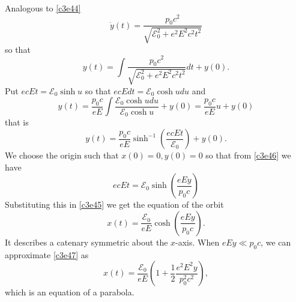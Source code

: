 \begin{enumerate}
Analogous to \eqref{c3e44}
\[
\dot{y}(t) = \frac{p_0c^2}{\sqrt{\mathcal{E}_0^2 + e^2E^2c^2t^2}}
\]
so that
\[
y(t) = \int \frac{p_0c^2}{\sqrt{\mathcal{E}_0^2 + e^2E^2c^2t^2}} dt + y(0).
\]
Put $ecEt = \mathcal{E}_0\sinh u$ so that $ecEdt = \mathcal{E}_0\cosh u du$
and
\[
y(t) = \frac{p_0c}{eE}\int \frac{\mathcal{E}_0\cosh u du}{\mathcal{E}_0\cosh u}
 + y(0) = \frac{p_0c}{eE} u + y(0) 
\]
that is
\begin{equation}\label{c3e46}
y(t) = \frac{p_0c}{eE} \sinh^{-1}\left(\frac{ecEt}{\mathcal{E}_0}\right) + y(0).
\end{equation}
We choose the origin such that $x(0) = 0, y(0) = 0$ so that from \eqref{c3e46}
we have
\[
ecEt = \mathcal{E}_0\sinh\left(\frac{eEy}{p_0c}\right)
\]
Substituting this in \eqref{c3e45} we get the equation of the orbit
\begin{equation}\label{c3e47}
x(t) = \frac{\mathcal{E}_0}{eE}\cosh\left(\frac{eEy}{p_0c}\right).
\end{equation}
It describes a catenary symmetric about the $x$-axis. When $eEy \ll p_0c$, we
can approximate \eqref{c3e47} as
\begin{equation}\label{c3e48}
x(t) = \frac{\mathcal{E}_0}{eE}\left(1 + \frac{1}{2}\frac{e^2E^2y}{p_0^2c^2}\right),
\end{equation}
which is an equation of a parabola.


\end{enumerate}
